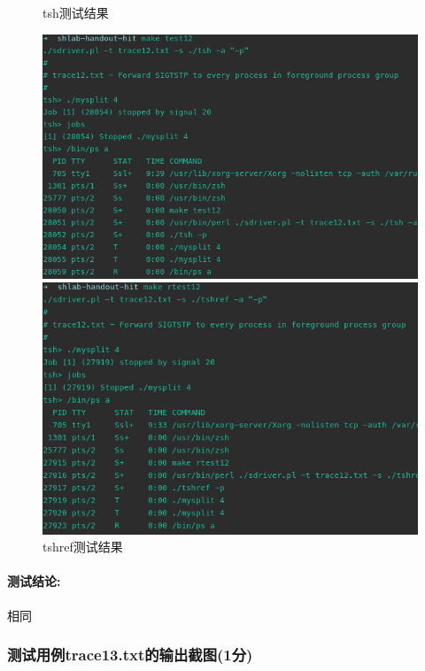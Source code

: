 \begin{figure}[H]
    \begin{minipage}[c]{0.5\linewidth}
        \centering
        \caption{tsh测试结果}
        \includegraphics[width=0.99\linewidth]{figures/test12.png}
    \end{minipage}
    \begin{minipage}[c]{0.5\linewidth}
        \centering
        \caption{tshref测试结果}
        \includegraphics[width=0.99\linewidth]{figures/rtest12.png}
    \end{minipage}
\end{figure}

\paragraph{测试结论:}相同

\subsubsection{测试用例trace13.txt的输出截图(1分)}

